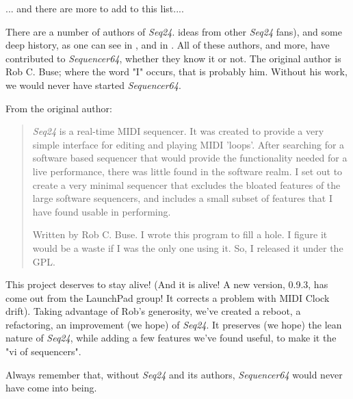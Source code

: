    ... and there are more to add to this list....

   There are a number of authors of \textsl{Seq24}.
   ideas from other \textsl{Seq24} fans),
   and some deep history,
   as one can see in ,
   and in .
   All of these authors, and more, have contributed to \textsl{Sequencer64},
   whether they know it or not.
   The original author is Rob C. Buse; where the word "I" occurs, that is
   probably him.  Without his work, we would never have started
   \textsl{Sequencer64}.

   From the original author:

   \begin{quotation}
      \textsl{Seq24} is a real-time MIDI sequencer. It was created to
      provide a very simple interface for editing and playing MIDI 'loops'.
      After searching for a software based sequencer that would provide the
      functionality needed for a live performance, there was little found in
      the software realm. I set out to create a very minimal sequencer that
      excludes the bloated features of the large software sequencers, and
      includes a small subset of features that I have found usable in
      performing. 

      Written by Rob C. Buse.  I wrote this program to fill a
      hole.  I figure it would be a waste if I was the only one
      using it.  So, I released it under the GPL.
   \end{quotation}

   This project deserves to stay alive!
   (And it is alive!  A new version, 0.9.3, has come out from the LaunchPad
   group!  It corrects a problem with MIDI Clock drift).
   Taking advantage of Rob's generosity,
   we've created a reboot, a refactoring, an improvement (we hope) of
   \textsl{Seq24}.  It preserves (we hope) the lean nature of \textsl{Seq24},
   while adding a few features we've found useful, to make it the
    "vi of sequencers".
   
   Always remember that, without \textsl{Seq24} and its authors,
   \textsl{Sequencer64} would never have come into being.

